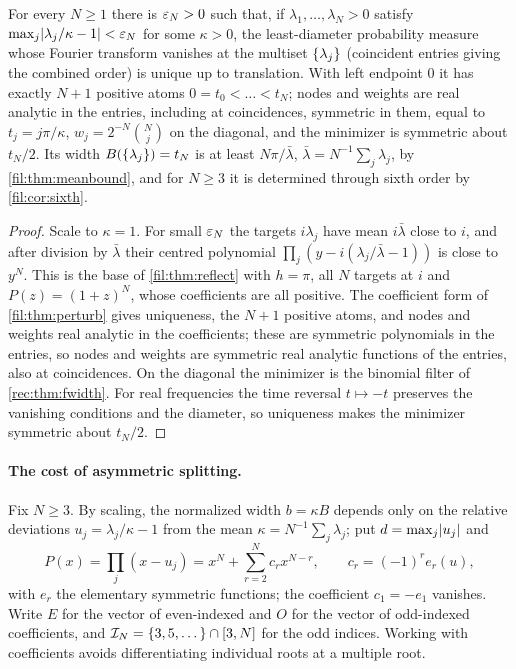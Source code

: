 \begin{theorem}\label{fil:thm:split}
For every $N\ge1$ there is $\varepsilon_N>0$ such that, if $\lambda_1,\dots,\lambda_N>0$ satisfy
$\max_j\lvert\lambda_j/\kappa-1\rvert<\varepsilon_N$ for some $\kappa>0$, the least-diameter probability measure whose
Fourier transform vanishes at the multiset $\{\lambda_j\}$ (coincident entries giving the combined
order) is unique up to translation. With left endpoint $0$ it has exactly $N+1$ positive atoms
$0=t_0<\dots<t_N$; nodes and weights are real analytic in the entries, including at coincidences,
symmetric in them, equal to $t_j=j\pi/\kappa$, $w_j=2^{-N}\binom Nj$ on the diagonal, and the minimizer is
symmetric about $t_N/2$. Its width $B(\{\lambda_j\})=t_N$ is at least $N\pi/\bar\lambda$,
$\bar\lambda=N^{-1}\sum_j\lambda_j$, by \cref{fil:thm:meanbound}, and for $N\ge3$ it is determined through
sixth order by \cref{fil:cor:sixth}.
\end{theorem}

\begin{proof}
Scale to $\kappa=1$. For small $\varepsilon_N$ the targets $i\lambda_j$ have mean $i\bar\lambda$ close to $i$, and after division by
$\bar\lambda$ their centred polynomial $\prod_j(y-i(\lambda_j/\bar\lambda-1))$ is close to $y^N$. This is the base of
\cref{fil:thm:reflect} with $h=\pi$, all $N$ targets at $i$ and $P(z)=(1+z)^N$, whose coefficients are all positive. The
coefficient form of \cref{fil:thm:perturb} gives uniqueness, the $N+1$ positive atoms, and nodes and weights real
analytic in the coefficients; these are symmetric polynomials in the entries, so nodes and weights are symmetric real
analytic functions of the entries, also at coincidences. On the diagonal the minimizer is the binomial filter of
\cref{rec:thm:fwidth}. For real frequencies the time reversal $t\mapsto-t$ preserves the vanishing conditions and the
diameter, so uniqueness makes the minimizer symmetric about $t_N/2$.
\end{proof}

\paragraph{The cost of asymmetric splitting.}
Fix $N\ge3$. By scaling, the normalized width $b=\kappa B$ depends only on the relative deviations
$u_j=\lambda_j/\kappa-1$ from the mean $\kappa=N^{-1}\sum_j\lambda_j$; put $d=\max_j\lvert u_j\rvert$ and
\[
 P(x)=\prod_j(x-u_j)=x^N+\sum_{r=2}^Nc_rx^{N-r},\qquad c_r=(-1)^re_r(u),
\]
with $e_r$ the elementary symmetric functions; the coefficient $c_1=-e_1$ vanishes. Write $E$ for the vector of
even-indexed and $O$ for the vector of odd-indexed coefficients, and $\mathcal I_N=\{3,5,\dots\}\cap[3,N]$ for the
odd indices. Working with coefficients avoids differentiating individual roots at a multiple root.

